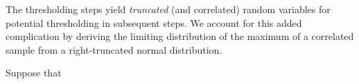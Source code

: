 The thresholding steps yield {\em truncated} (and correlated) random
variables for potential thresholding  in subsequent
steps. We account for this added complication by deriving the limiting 
distribution of the maximum of a correlated sample from a
right-truncated normal distribution. %

Suppose that 
\begin{comment}



To achieve the above, from a given vector of bandwidth, ${\bf h}=(h_x,h_y,h_z)'$, and using a Gaussian kernel 3D obtain ${\bf S}^{-1}_{\bf h}$ and let ${\bf R} = {\bf S}^{-1}_{\bf h}$.  Our goal now is to obtain, ${\bf R}^{-1/2}$ one way to achieve this is by using the Fast Fourier Transform (FFT). From ${\bf S}$  obtained $\check{{\bf S}}^{-1}_{\bf h} $ and obtain ${\bf S}^{1/2}_{\bf h}$. Then for a given ${\bf h}=(h_1,h_2,h_3)'$ compute ${\bf Y} = {\bf S}^{-1/2}_{\bf h} {\bf X}$.   
From ~\citep{resnick2013}; a non-degenerate limiting distribution function $F$ of a sample maximal $X_{(n)}$, 
\begin{enumerate}
\item Fr\'echet: $G_{1,\alpha}(x) = \exp\{-x^{-\alpha}\} I(x \geq 0)$.
\item Weibull:  $G_{2,\alpha}(x) = \exp\{-(-x^{-\alpha})\} I(x \leq 0)$.
\item Gumbel:  $G_{3,\alpha = 0}(x) = \exp\{-e^{-x}\} I(x \in \R)$.
\end{enumerate}
\end{comment}
